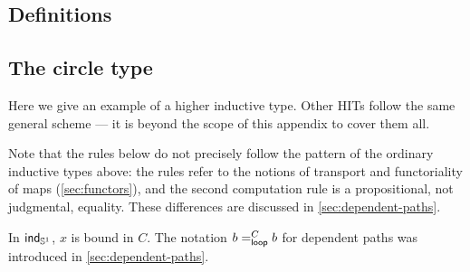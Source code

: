 \subsection{Definitions}



\subsection{The circle type}

Here we give an example of a higher inductive type.  Other HITs follow the same
general scheme --- it is beyond the scope of this appendix to cover them all.

Note that the rules below do not precisely follow the pattern of the ordinary
inductive types above: the rules refer to the notions of transport and
functoriality of maps (\autoref{sec:functors}), and the second computation rule
is a propositional, not judgmental, equality. These differences are discussed
in \autoref{sec:dependent-paths}.


In $\ind{\Sn^1}$, $x$ is bound in $C$.  The notation ${\dpath C \lloop b b}$ for dependent paths was introduced in \autoref{sec:dependent-paths}.

